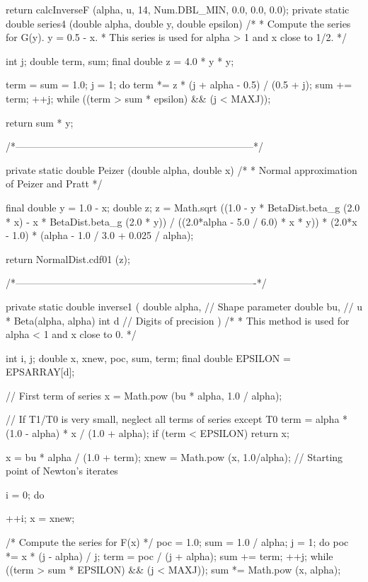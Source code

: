 \begin{code}
\begin{hide} {
      return calcInverseF (alpha, u, 14, Num.DBL_MIN, 0.0, 0.0, 0.0);
   }
   private static double series4 (double alpha, double y, double epsilon)
   /*
    * Compute the series for G(y).   y = 0.5 - x.
    * This series is used for alpha > 1 and x close to 1/2.
    */
   {
      int j;
      double term, sum;
      final double z = 4.0 * y * y;

      term = sum = 1.0;
      j = 1;
      do {
         term *= z * (j + alpha - 0.5) / (0.5 + j);
         sum += term;
         ++j;
      } while ((term > sum * epsilon) && (j < MAXJ));

      return sum * y;
   }

   /*------------------------------------------------------------------------*/

   private static double Peizer (double alpha, double x)
   /*
    * Normal approximation of Peizer and Pratt
    */
   {
      final double y = 1.0 - x;
      double z;
      z = Math.sqrt ((1.0 - y * BetaDist.beta_g (2.0 * x) -
         x * BetaDist.beta_g (2.0 * y)) / ((2.0*alpha - 5.0 / 6.0) * x * y)) *
         (2.0*x - 1.0) * (alpha - 1.0 / 3.0 + 0.025 / alpha);

      return NormalDist.cdf01 (z);
   }

   /*-------------------------------------------------------------------------*/

   private static double inverse1 (
      double alpha,                // Shape parameter
      double bu,                   // u * Beta(alpha, alpha)
      int d                        // Digits of precision
      )
   /*
    * This method is used for alpha < 1 and x close to 0.
    */
   {
      int i, j;
      double x, xnew, poc, sum, term;
      final double EPSILON = EPSARRAY[d];

      // First term of series
      x = Math.pow (bu * alpha, 1.0 / alpha);

      // If T1/T0 is very small, neglect all terms of series except T0
      term = alpha * (1.0 - alpha) * x / (1.0 + alpha);
      if (term < EPSILON)
         return x;

      x = bu * alpha / (1.0 + term);
      xnew = Math.pow (x, 1.0/alpha);  // Starting point of Newton's iterates

      i = 0;
      do {
         ++i;
         x = xnew;

         /* Compute the series for F(x) */
         poc = 1.0;
         sum = 1.0 / alpha;
         j = 1;
         do {
            poc *= x * (j - alpha) / j;
            term = poc / (j + alpha);
            sum += term;
            ++j;
         } while ((term > sum * EPSILON) && (j < MAXJ));
         sum *= Math.pow (x, alpha);

}}
\end{hide}
\end{code}
